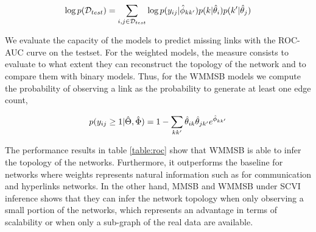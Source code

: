 \begin{equation*}
\log p(\mathcal{D}_{test}) = \sum_{i,j \in \mathcal{D}_{test}} \log p(y_{ij} | \hat\phi_{kk'}) p(k|\hat\theta_i) p(k'|\hat\theta_j)
\end{equation*}


%
%

We evaluate the capacity of the models to predict missing links with the ROC-AUC curve on the testset. For the weighted models, the measure consists to evaluate to what extent they can reconstruct the topology of the network and to compare them with binary models. Thus, for the WMMSB models we compute the probability of observing a link as the probability to generate at least one edge count,

\begin{table}
\centering
	
\label{table:roc}
\end{table}

\begin{equation*}
p(y_{ij} \geq 1 | \hat\Theta, \hat\Phi) = 1 - \sum_{kk'} \hat\theta_{ik} \hat\theta_{jk'} e^{\hat\phi_{kk'}}
\end{equation*}

The performance results in table \ref{table:roc} show that WMMSB is able to infer the topology of the networks. Furthermore, it outperforms the baseline for networks where weights represents natural information such as for communication and hyperlinks networks. 
In the other hand, MMSB and WMMSB under SCVI inference shows that they can infer the network topology when only observing a small portion of the networks, which represents an advantage in terms of scalability or when only a sub-graph of the real data are available.

%
%

%



%
%




